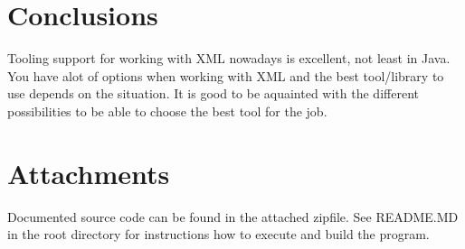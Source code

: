 \documentclass[a4paper, 11pt]{article}
\begin{document}
\section*{Conclusions}
Tooling support for working with XML nowadays is excellent, not least in Java. You have alot of options when working with XML and the best tool/library to use depends on the situation. It is good to be aquainted with the different possibilities to be able to choose the best tool for the job.

\section*{Attachments}
Documented source code can be found in the attached zipfile. See README.MD in the root directory for instructions how to execute and build the program.

{}

\end{document}
